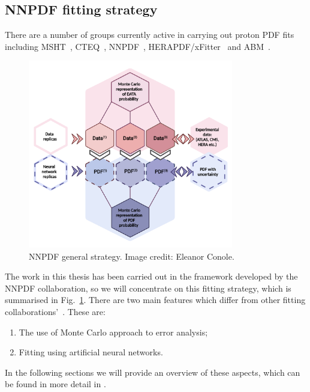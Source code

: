 \subsection{NNPDF fitting strategy}

There are a number of groups currently active in carrying out proton PDF fits including MSHT~\cite{Bailey:2020ooq}, CTEQ~\cite{Hou:2019efy}, NNPDF~\cite{nnpdf}, HERAPDF/xFitter~\cite{CooperSarkar:2011aa} and ABM~\cite{Alekhin:2019ntu}. 
\begin{figure}[H]
\centering
\includegraphics[width=0.8\textwidth]{background/eleanor_strategy.pdf}
\caption{NNPDF general strategy. Image credit: Eleanor Conole.}
\label{fig:generalstrategy}
\end{figure}
The work in this thesis has been carried out in the framework developed by the NNPDF collaboration, so we will concentrate on this fitting strategy, which is summarised in Fig.~\ref{fig:generalstrategy}. There are two main features which differ from other fitting collaborations'~\cite{Forte:2002fg}. These are:
\begin{enumerate}
\item  The use of Monte Carlo approach to error analysis;
    \item  Fitting using artificial neural networks.
\end{enumerate}

In the following sections we will provide an overview of these aspects, which can be found in more detail in \cite{Ball:2010de, Ball:2012cx, Ball:2017nwa}.


